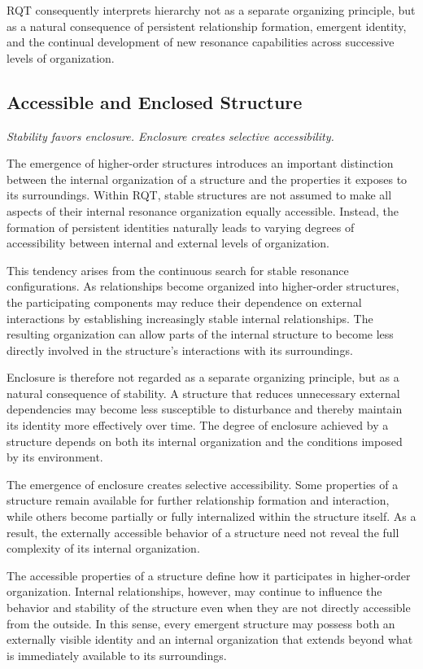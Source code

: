 \documentclass[11pt,a4paper]{article}
\begin{document}
RQT consequently interprets hierarchy not as a separate organizing principle, but as a natural consequence of persistent relationship formation, emergent identity, and the continual development of new resonance capabilities across successive levels of organization.


\subsection{Accessible and Enclosed Structure}

\emph{Stability favors enclosure. Enclosure creates selective accessibility.}

The emergence of higher-order structures introduces an important distinction between the internal organization of a structure and the properties it exposes to its surroundings. Within RQT, stable structures are not assumed to make all aspects of their internal resonance organization equally accessible. Instead, the formation of persistent identities naturally leads to varying degrees of accessibility between internal and external levels of organization.

This tendency arises from the continuous search for stable resonance configurations. As relationships become organized into higher-order structures, the participating components may reduce their dependence on external interactions by establishing increasingly stable internal relationships. The resulting organization can allow parts of the internal structure to become less directly involved in the structure's interactions with its surroundings.

Enclosure is therefore not regarded as a separate organizing principle, but as a natural consequence of stability. A structure that reduces unnecessary external dependencies may become less susceptible to disturbance and thereby maintain its identity more effectively over time. The degree of enclosure achieved by a structure depends on both its internal organization and the conditions imposed by its environment.

The emergence of enclosure creates selective accessibility. Some properties of a structure remain available for further relationship formation and interaction, while others become partially or fully internalized within the structure itself. As a result, the externally accessible behavior of a structure need not reveal the full complexity of its internal organization.

The accessible properties of a structure define how it participates in higher-order organization. Internal relationships, however, may continue to influence the behavior and stability of the structure even when they are not directly accessible from the outside. In this sense, every emergent structure may possess both an externally visible identity and an internal organization that extends beyond what is immediately available to its surroundings.
\end{document}
